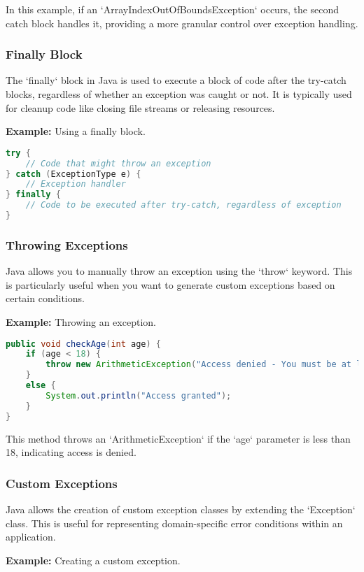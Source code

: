\documentclass{article}
\begin{document}
In this example, if an `ArrayIndexOutOfBoundsException` occurs, the second catch block handles it, providing a more granular control over exception handling.

\subsubsection{Finally Block}
The `finally` block in Java is used to execute a block of code after the try-catch blocks, regardless of whether an exception was caught or not. It is typically used for cleanup code like closing file streams or releasing resources.

\textbf{Example:} Using a finally block.

\begin{lstlisting}[language=Java]
try {
    // Code that might throw an exception
} catch (ExceptionType e) {
    // Exception handler
} finally {
    // Code to be executed after try-catch, regardless of exception
}
\end{lstlisting}

\subsubsection{Throwing Exceptions}
Java allows you to manually throw an exception using the `throw` keyword. This is particularly useful when you want to generate custom exceptions based on certain conditions.

\textbf{Example:} Throwing an exception.

\begin{lstlisting}[language=Java]
public void checkAge(int age) {
    if (age < 18) {
        throw new ArithmeticException("Access denied - You must be at least 18 years old.");
    }
    else {
        System.out.println("Access granted");
    }
}
\end{lstlisting}

This method throws an `ArithmeticException` if the `age` parameter is less than 18, indicating access is denied.

\newpage
\subsubsection{Custom Exceptions}
Java allows the creation of custom exception classes by extending the `Exception` class. This is useful for representing domain-specific error conditions within an application.

\textbf{Example:} Creating a custom exception.
\end{document}
